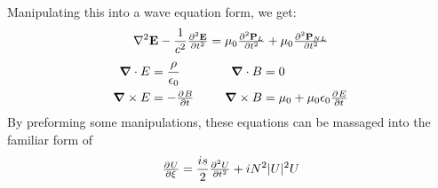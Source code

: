 \documentclass[12pt, titlepage]{article}
\renewcommand{\v}[1]{\ensuremath{\mathbf{#1}}} %
\newcommand{\gv}[1]{\ensuremath{\mbox{\boldmath$ #1 $}}}
\renewcommand{\div}[1]{\gv{\nabla} \cdot #1} %
\newcommand{\curl}[1]{\gv{\nabla} \times #1} %
\begin{document}
\begin{spacing}{1.1}
Manipulating this into a wave equation form, we get:
\begin{equation}
\nabla^2 \v{E} - \frac{1}{c^2} \pd[2]{\v{E}}{t} = \mu_0 \pd[2]{\v{P}_L}{t} + \mu_0 \pd[2]{\v{P}_{NL}}{t}
\end{equation}
\begin{alignat}{2}
       \div{E} &= \frac{\rho}{\epsilon_0} &\qquad \div{B} &=0\\
       \curl{E} &=- \pd{B}{t}  & \curl{B} &= \mu_0 + \mu_0 \epsilon_0 \pd{E}{t} 
       \end{alignat}
By preforming some manipulations, these equations can be massaged into the familiar form of 
\begin{equation}
\pd{U}{\xi}= \frac{is}{2} \pd[2]{U}{t} + i N^2 |U|^2U 
\end{equation}
\end{spacing}
\end{document}
